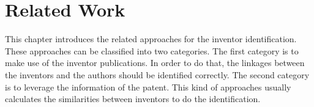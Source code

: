 
\chapter{Related Work}
\label{cha:relwork}
This chapter introduces the related approaches for the inventor identification. These approaches can be classified into two categories. The first category is to make use of the inventor publications. In order to do that, the linkages between the inventors and the authors should be identified correctly. The second category is to leverage the information of the patent. This kind of approaches usually calculates the similarities between inventors to do the identification.



